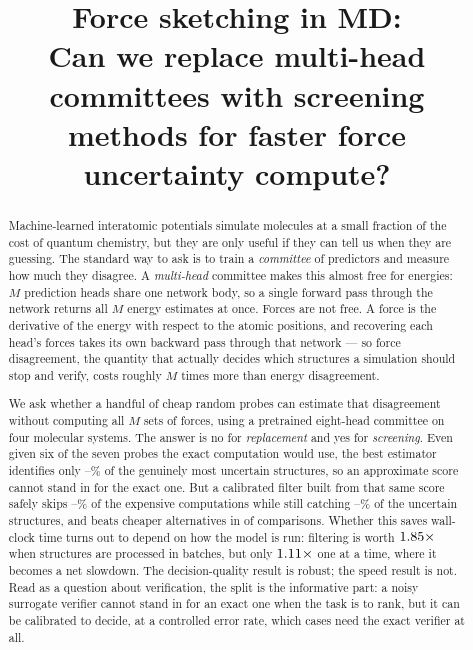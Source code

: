\documentclass{article}
\title{Force sketching in MD:\\
Can we replace multi-head committees with screening\\
methods for faster force uncertainty compute?}
\author{}
\begin{document}
\maketitle

\begin{abstract}
Machine-learned interatomic potentials simulate molecules at a small fraction of the cost of quantum
chemistry, but they are only useful if they can tell us when they are guessing. The standard way to
ask is to train a \emph{committee} of predictors and measure how much they disagree. A
\emph{multi-head} committee makes this almost free for energies: $M$ prediction heads share one
network body, so a single forward pass through the network returns all $M$ energy estimates at once.
Forces are not free. A force is the derivative of the energy with respect to the atomic positions,
and recovering each head's forces takes its own backward pass through that network --- so force
disagreement, the quantity that actually decides which structures a simulation should stop and
verify, costs roughly $M$ times more than energy disagreement.

We ask whether a handful of cheap random probes can estimate that disagreement without computing all
$M$ sets of forces, using a pretrained eight-head committee on four molecular systems. The answer is
no for \emph{replacement} and yes for \emph{screening}. Even given six of the seven probes the exact
computation would use, the best estimator identifies only
\fsMaxRecallKSixLoPct--\fsMaxRecallKSixHiPct\% of the genuinely most uncertain structures, so an
approximate score cannot stand in for the exact one. But a calibrated filter built from that same
score safely skips \fsGateCVSkipLoPct--\fsGateCVSkipHiPct\% of the expensive computations while
still catching \fsGateCVRecallLoPct--\fsGateCVRecallHiPct\% of the uncertain structures, and beats
cheaper
alternatives in \fsGateCVDominates{} of \fsGateCVComparisons{} comparisons. Whether this saves
wall-clock time turns out to depend on how the model is run: filtering is worth
$1.85\times$ when structures are processed in batches, but only
$1.11\times$ one at a time, where it becomes a net slowdown. The decision-quality
result is robust; the speed result is not. Read as a question about verification, the split is
the informative part: a noisy surrogate verifier cannot stand in for an exact one when the task is
to rank, but it can be calibrated to decide, at a controlled error rate, which cases need the exact
verifier at all.
\end{abstract}
\end{document}
